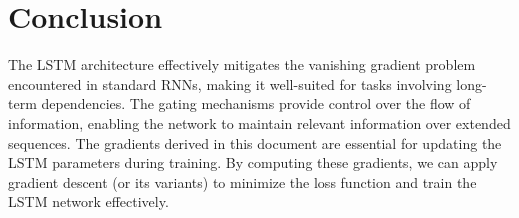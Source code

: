 \documentclass{article}
\begin{document}
\section{Conclusion}
The LSTM architecture effectively mitigates the vanishing gradient problem encountered in standard RNNs, making it well-suited for tasks involving long-term dependencies. The gating mechanisms provide control over the flow of information, enabling the network to maintain relevant information over extended sequences. The gradients derived in this document are essential for updating the LSTM parameters during training. By computing these gradients, we can apply gradient descent (or its variants) to minimize the loss function and train the LSTM network effectively.
\end{document}
